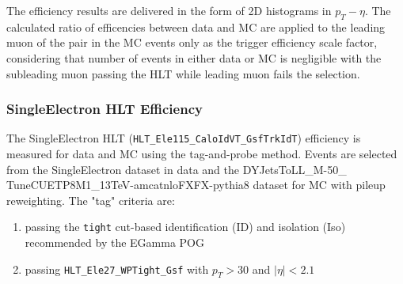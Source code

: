 \vspace{0.3cm}
The efficiency results are delivered in the form of 2D histograms in $p_T - \eta$. The calculated ratio of efficencies between data and MC are applied to the leading muon of the pair in the MC events only as the trigger efficiency scale factor, considering that number of events in either data or MC is negligible with the subleading muon passing the HLT while leading muon fails the selection.

\subsubsection{SingleElectron HLT Efficiency}
The SingleElectron HLT (\texttt{HLT\_Ele115\_CaloIdVT\_GsfTrkIdT}) efficiency is measured for data and MC using the tag-and-probe method. Events are selected from the SingleElectron dataset in data and the DYJetsToLL\_M-50\_ TuneCUETP8M1\_13TeV-amcatnloFXFX-pythia8 dataset for MC with pileup reweighting. The "tag" criteria are:
\begin{enumerate}
\item passing the \texttt{tight} cut-based identification (ID) and isolation (Iso) recommended by the EGamma POG %
\item passing \texttt{HLT\_Ele27\_WPTight\_Gsf} with $p_T>30$ and $|\eta|<2.1$
\end{enumerate}


